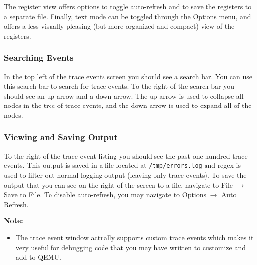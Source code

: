 \documentclass{article}
\newcommand{\code}[1]{\texttt{#1}}
\begin{document}
The register view offers options to toggle auto-refresh and to save the registers to a separate file. Finally, text mode can be toggled through the Options menu, and offers a less visually pleasing (but more organized and compact) view of the registers. \newline

\subsubsection{Searching Events}
In the top left of the trace events screen you should see a search bar. You can use this search bar to search for trace events. To the right of the search bar you should see an up arrow and a down arrow. The up arrow is used to collapse all nodes in the tree of trace events, and the down arrow is used to expand all of the nodes. 
\newpage

\subsubsection{Viewing and Saving Output}
To the right of the trace event listing you should see the past one hundred trace events. This output is saved in a file located at \code{/tmp/errors.log} and regex is used to filter out normal logging output (leaving only trace events). 
To save the output that you can see on the right of the screen to a file, navigate to File $\rightarrow$ Save to File. To disable auto-refresh, you may navigate to Options $\rightarrow$ Auto Refresh. \newline

\textbf{Note:}
\begin{itemize}
    \item The trace event window actually supports custom trace events which makes it very useful for debugging code that you may have written to customize and add to QEMU.
\end{itemize}
\end{document}

